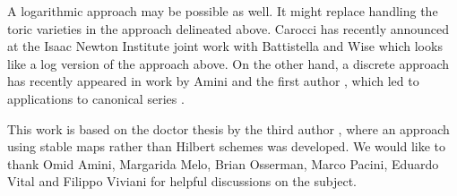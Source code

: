 \documentclass[a4paper,11pt]{amsart}
\theoremstyle{plain}
\theoremstyle{definition}
\theoremstyle{remark}
\begin{document}
A logarithmic approach may be possible as well. It might replace handling the toric varieties in the approach delineated above. Carocci has recently announced at the Isaac Newton Institute joint work with Battistella and Wise which looks like a log version of the approach above. On the other hand, a discrete approach has recently appeared in work by Amini and the first author \cite{AE1}, which led to applications to canonical series \cite{AE2}.  %

This work is based on the doctor thesis by the third author \cite{Rizzo}, where an approach using stable maps rather than Hilbert schemes was developed. We would like to thank Omid Amini, Margarida Melo, Brian Osserman, Marco Pacini, Eduardo Vital and Filippo Viviani for helpful discussions on the subject.



\end{document}
